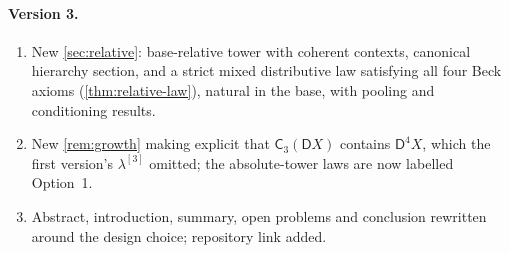 \documentclass[11pt]{article}
\theoremstyle{definition}
\theoremstyle{remark}
\newcommand{\D}{\mathsf{D}}
\newcommand{\C}{\mathsf{C}}
\begin{document}
\paragraph{Version 3.}
\begin{enumerate}[leftmargin=*,label=(\alph*)]
\item New \cref{sec:relative}: base-relative tower with coherent contexts, canonical hierarchy
  section, and a strict mixed distributive law satisfying all four Beck axioms
  (\cref{thm:relative-law}), natural in the base, with pooling and conditioning results.
\item New \cref{rem:growth} making explicit that $\C_3(\D X)$ contains $\D^4X$, which the first
  version's $\lambda^{[3]}$ omitted; the absolute-tower laws are now labelled Option~1.
\item Abstract, introduction, summary, open problems and conclusion rewritten around the design
  choice; repository link added.
\end{enumerate}
\end{document}
